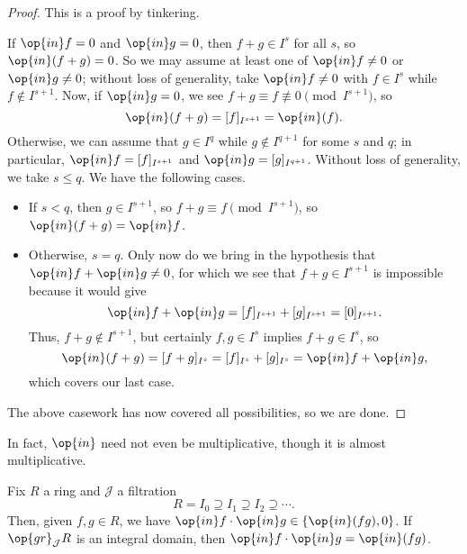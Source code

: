 \begin{proof}
	This is a proof by tinkering.
	
	If $\op{in}f=0$ and $\op{in}g=0$, then $f+g\in I^s$ for all $s$, so $\op{in}(f+g)=0$. So we may assume at least one of $\op{in}f\ne0$ or $\op{in}g\ne0$; without loss of generality, take $\op{in}f\ne0$ with $f\in I^s$ while $f\notin I^{s+1}$. Now, if $\op{in}g=0$, we see $f+g\equiv f\not\equiv0\pmod{I^{s+1}}$, so
	\[\op{in}(f+g)=[f]_{I^{s+1}}=\op{in}(f).\]
	Otherwise, we can assume that $g\in I^q$ while $g\notin I^{q+1}$ for some $s$ and $q$; in particular, $\op{in}f=[f]_{I^{s+1}}$ and $\op{in}g=[g]_{I^{q+1}}$. Without loss of generality, we take $s\le q$. We have the following cases.
	\begin{itemize}
		\item If $s<q$, then $g\in I^{s+1}$, so $f+g\equiv f\pmod{I^{s+1}}$, so $\op{in}(f+g)=\op{in}f$.
		\item Otherwise, $s=q$. Only now do we bring in the hypothesis that $\op{in}f+\op{in}g\ne0$, for which we see that $f+g\in I^{s+1}$ is impossible because it would give
		\[\op{in}f+\op{in}g=[f]_{I^{s+1}}+[g]_{I^{s+1}}=[0]_{I^{s+1}}.\]
		Thus, $f+g\notin I^{s+1}$, but certainly $f,g\in I^s$ implies $f+g\in I^s$, so
		\[\op{in}(f+g)=[f+g]_{I^s}=[f]_{I^s}+[g]_{I^s}=\op{in}f+\op{in}g,\]
		which covers our last case.
	\end{itemize}
	The above casework has now covered all possibilities, so we are done.
\end{proof}
In fact, $\op{in}$ need not even be multiplicative, though it is almost multiplicative.
\begin{proposition} \label{prop:multinitialform}
	Fix $R$ a ring and $\mathcal J$ a filtration
	\[R=I_0\supseteq I_1\supseteq I_2\supseteq\cdots.\]
	Then, given $f,g\in R$, we have $\op{in}f\cdot\op{in}g\in\{\op{in}(fg),0\}$. If $\op{gr}_\mathcal JR$ is an integral domain, then $\op{in}f\cdot\op{in}g=\op{in}(fg)$.
\end{proposition}
